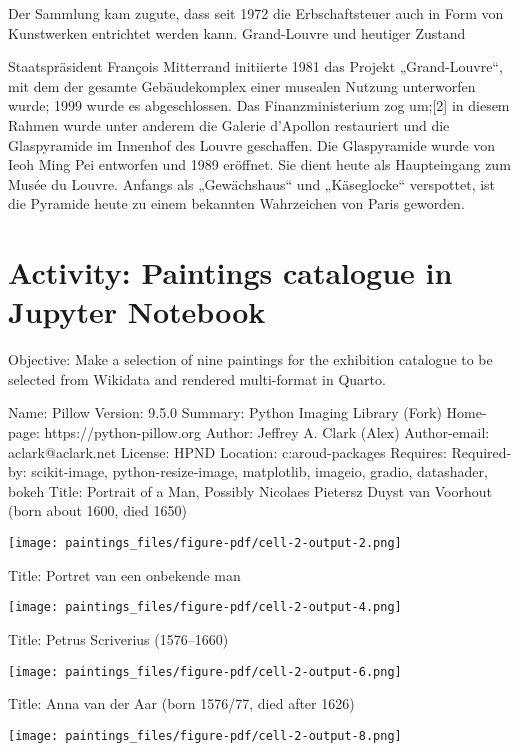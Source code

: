 \documentclass[
  letterpaper,
]{book}
\begin{document}
Der Sammlung kam zugute, dass seit 1972 die Erbschaftsteuer auch in Form
von Kunstwerken entrichtet werden kann. Grand-Louvre und heutiger
Zustand

Staatspräsident François Mitterrand initiierte 1981 das Projekt
„Grand-Louvre``, mit dem der gesamte Gebäudekomplex einer musealen
Nutzung unterworfen wurde; 1999 wurde es abgeschlossen. Das
Finanzministerium zog um;{[}2{]} in diesem Rahmen wurde unter anderem
die Galerie d'Apollon restauriert und die Glaspyramide im Innenhof des
Louvre geschaffen. Die Glaspyramide wurde von Ieoh Ming Pei entworfen
und 1989 eröffnet. Sie dient heute als Haupteingang zum Musée du Louvre.
Anfangs als „Gewächshaus`` und „Käseglocke`` verspottet, ist die
Pyramide heute zu einem bekannten Wahrzeichen von Paris geworden.


\hypertarget{activity-paintings-catalogue-in-jupyter-notebook}{%
\chapter{Activity: Paintings catalogue in Jupyter
Notebook}\label{activity-paintings-catalogue-in-jupyter-notebook}}

Objective: Make a selection of nine paintings for the exhibition
catalogue to be selected from Wikidata and rendered multi-format in
Quarto.

Name: Pillow Version: 9.5.0 Summary: Python Imaging Library (Fork)
Home-page: https://python-pillow.org Author: Jeffrey A. Clark (Alex)
Author-email: aclark@aclark.net License: HPND Location:
c:\users\ahmad aroud\lib\site-packages Requires: Required-by:
scikit-image, python-resize-image, matplotlib, imageio, gradio,
datashader, bokeh Title: Portrait of a Man, Possibly Nicolaes Pietersz
Duyst van Voorhout (born about 1600, died 1650)

\texttt{[image: paintings\_files/figure-pdf/cell-2-output-2.png]}

Title: Portret van een onbekende man

\texttt{[image: paintings\_files/figure-pdf/cell-2-output-4.png]}

Title: Petrus Scriverius (1576--1660)

\texttt{[image: paintings\_files/figure-pdf/cell-2-output-6.png]}

Title: Anna van der Aar (born 1576/77, died after 1626)

\texttt{[image: paintings\_files/figure-pdf/cell-2-output-8.png]}
\end{document}
